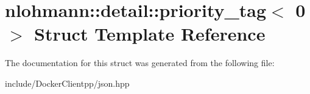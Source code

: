 \hypertarget{structnlohmann_1_1detail_1_1priority__tag_3_010_01_4}{}\section{nlohmann\+::detail\+::priority\+\_\+tag$<$ 0 $>$ Struct Template Reference}
\label{structnlohmann_1_1detail_1_1priority__tag_3_010_01_4}


The documentation for this struct was generated from the following file\+:\begin{DoxyCompactItemize}
\item 
include/\+Docker\+Clientpp/json.\+hpp\end{DoxyCompactItemize}
